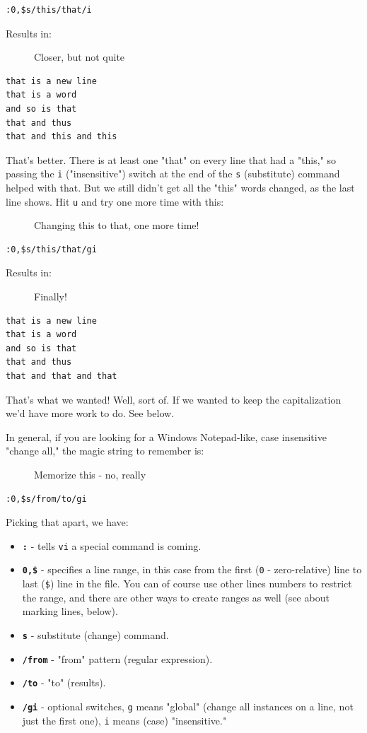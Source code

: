 \documentclass[10pt,]{book}
\numberwithin{figure}{chapter}
\DeclareRobustCommand{\drcap}[1]{\begin{figure}[H]\caption{#1}\end{figure}}
\begin{document}
\begin{verbatim}
:0,$s/this/that/i
\end{verbatim}

Results in:

\drcap{Closer, but not quite}

\begin{verbatim}
that is a new line
that is a word
and so is that
that and thus
that and this and this
\end{verbatim}

That's better. There is at least one "that" on every line that had a
"this," so passing the \texttt{i} ("insensitive") switch at the end of
the \texttt{s} (substitute) command helped with that. But we still
didn't get all the "this" words changed, as the last line shows. Hit
\texttt{u} and try one more time with this:

\drcap{Changing this to that, one more time!}

\begin{verbatim}
:0,$s/this/that/gi
\end{verbatim}

Results in:

\drcap{Finally!}

\begin{verbatim}
that is a new line
that is a word
and so is that
that and thus
that and that and that
\end{verbatim}

That's what we wanted! Well, sort of. If we wanted to keep the
capitalization we'd have more work to do. See below.

In general, if you are looking for a Windows Notepad-like, case
insensitive "change all," the magic string to remember is:

\drcap{Memorize this - no, really}

\begin{verbatim}
:0,$s/from/to/gi
\end{verbatim}

Picking that apart, we have:

\begin{itemize}
\item
  \textbf{\texttt{:}} - tells \texttt{vi} a special command is coming.
\item
  \textbf{\texttt{0,\$}} - specifies a line range, in this case from the
  first (\texttt{0} - zero-relative) line to last (\texttt{\$}) line in
  the file. You can of course use other lines numbers to restrict the
  range, and there are other ways to create ranges as well (see about
  marking lines, below).
\item
  \textbf{\texttt{s}} - substitute (change) command.
\item
  \textbf{\texttt{/from}} - "from" pattern (regular expression).
\item
  \textbf{\texttt{/to}} - "to" (results).
\item
  \textbf{\texttt{/gi}} - optional switches, \texttt{g} means "global"
  (change all instances on a line, not just the first one), \texttt{i}
  means (case) "insensitive."
\end{itemize}
\end{document}
